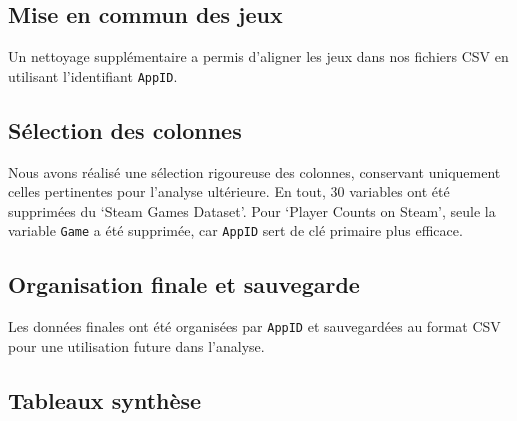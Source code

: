 \documentclass[mstat,12pt]{unswthesis}
\begin{document}
\hypertarget{mise-en-commun-des-jeux}{%
\subsection{Mise en commun des jeux}\label{mise-en-commun-des-jeux}}

Un nettoyage supplémentaire a permis d'aligner les jeux dans nos
fichiers CSV en utilisant l'identifiant \texttt{AppID}.

\hypertarget{suxe9lection-des-colonnes}{%
\subsection{Sélection des colonnes}\label{suxe9lection-des-colonnes}}

Nous avons réalisé une sélection rigoureuse des colonnes, conservant
uniquement celles pertinentes pour l'analyse ultérieure. En tout, 30
variables ont été supprimées du `Steam Games Dataset'. Pour `Player
Counts on Steam', seule la variable \texttt{Game} a été supprimée, car
\texttt{AppID} sert de clé primaire plus efficace.

\hypertarget{organisation-finale-et-sauvegarde}{%
\subsection{Organisation finale et
sauvegarde}\label{organisation-finale-et-sauvegarde}}

Les données finales ont été organisées par \texttt{AppID} et
sauvegardées au format CSV pour une utilisation future dans l'analyse.
\newpage

\hypertarget{tableaux-synthuxe8se}{%
\subsection{Tableaux synthèse}\label{tableaux-synthuxe8se}}
\end{document}

